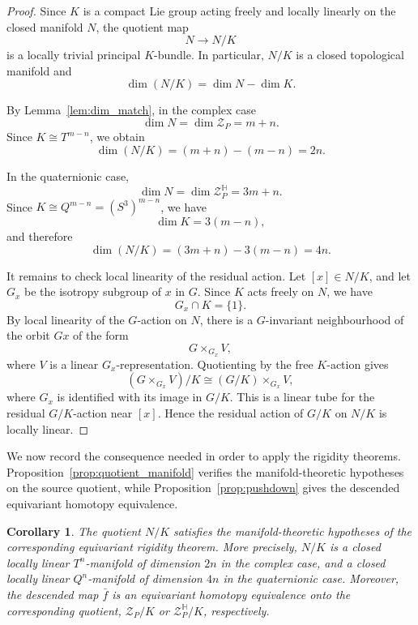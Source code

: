 \documentclass[11pt,a4paper]{article}
\numberwithin{equation}{section}
\newtheorem{cor}[definition]{Corollary}
\theoremstyle{named}
\begin{document}
\begin{proof}
Since \(K\) is a compact Lie group acting freely and locally linearly on the closed manifold \(N\), the quotient map
\[
    N\longrightarrow N/K
\]
is a locally trivial principal \(K\)-bundle. In particular, \(N/K\) is a closed topological manifold and
\[
    \dim(N/K)=\dim N-\dim K.
\]

By Lemma~\ref{lem:dim_match}, in the complex case
\[
    \dim N=\dim\mathcal Z_P=m+n.
\]
Since \(K\cong T^{m-n}\), we obtain
\[
    \dim(N/K)
    =
    (m+n)-(m-n)
    =
    2n.
\]

In the quaternionic case,
\[
    \dim N=\dim\mathcal Z_P^{\mathbb H}=3m+n.
\]
Since \(K\cong Q^{m-n}=(S^3)^{m-n}\), we have
\[
\dim K=3(m-n),
\]
and therefore
\[
\dim(N/K)=(3m+n)-3(m-n)=4n.
\]

It remains to check local linearity of the residual action. Let \([x]\in N/K\), and let \(G_x\) be the isotropy subgroup of \(x\) in \(G\). Since \(K\) acts freely on \(N\), we have
\[
G_x\cap K=\{1\}.
\]
By local linearity of the \(G\)-action on \(N\), there is a \(G\)-invariant neighbourhood of the orbit \(Gx\) of the form
\[
    G\times_{G_x} V,
\]
where \(V\) is a linear \(G_x\)-representation.  Quotienting by the free \(K\)-action gives
\[
(G\times_{G_x}V)/K\cong (G/K)\times_{G_x}V,
\]
where \(G_x\) is identified with its image in \(G/K\). This is a linear tube for the residual \(G/K\)-action near \([x]\). Hence the residual action of \(G/K\) on \(N/K\) is locally linear.
\end{proof}

We now record the consequence needed in order to apply the rigidity theorems. Proposition~\ref{prop:quotient_manifold} verifies the manifold-theoretic hypotheses on the source quotient, while Proposition~\ref{prop:pushdown} gives the descended equivariant homotopy equivalence.

\begin{cor}\label{cor:quotient_satisfies_rigidity_hypotheses}
The quotient \(N/K\) satisfies the manifold-theoretic hypotheses of the corresponding equivariant rigidity theorem. More precisely, \(N/K\) is a closed locally linear \(T^n\)-manifold of dimension \(2n\) in the complex case, and a closed locally linear \(Q^n\)-manifold of dimension \(4n\) in the quaternionic case. Moreover, the descended map \(\bar f\) is an equivariant homotopy equivalence onto the corresponding quotient, \(\mathcal Z_P/K\) or \(\mathcal Z_P^{\mathbb H}/K\), respectively.
\end{cor}
\end{document}
